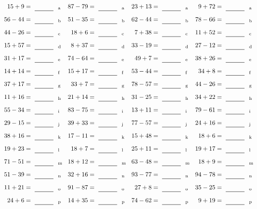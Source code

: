 \documentclass
[
  draft    = true,
  fontsize = 11pt,
  parskip  = half-
]
{scrartcl}
\begin{document}
\clearpage
\begin{align*}
    \pline{15+9}&=\rline{a}
  & \pline{87-79}&=\rline{a}
  & \pline{23+13}&=\rline{a}
  & \pline{9+72}&=\rline{a} \\[1ex]
    \pline{56-44}&=\rline{b}
  & \pline{51-35}&=\rline{b}
  & \pline{62-44}&=\rline{b}
  & \pline{78-66}&=\rline{b} \\[1ex]
    \pline{44-26}&=\rline{c}
  & \pline{18+6}&=\rline{c}
  & \pline{7+38}&=\rline{c}
  & \pline{11+52}&=\rline{c} \\[1ex]
    \pline{15+57}&=\rline{d}
  & \pline{8+37}&=\rline{d}
  & \pline{33-19}&=\rline{d}
  & \pline{27-12}&=\rline{d} \\[1ex]
    \pline{31+17}&=\rline{e}
  & \pline{74-64}&=\rline{e}
  & \pline{49+7}&=\rline{e}
  & \pline{38+26}&=\rline{e} \\[1ex]
    \pline{14+14}&=\rline{f}
  & \pline{15+17}&=\rline{f}
  & \pline{53-44}&=\rline{f}
  & \pline{34+8}&=\rline{f} \\[1ex]
    \pline{37+17}&=\rline{g}
  & \pline{33+7}&=\rline{g}
  & \pline{78-57}&=\rline{g}
  & \pline{44-26}&=\rline{g} \\[1ex]
    \pline{11+16}&=\rline{h}
  & \pline{21+14}&=\rline{h}
  & \pline{31-25}&=\rline{h}
  & \pline{34+22}&=\rline{h} \\[1ex]
    \pline{55-34}&=\rline{i}
  & \pline{83-75}&=\rline{i}
  & \pline{13+11}&=\rline{i}
  & \pline{79-61}&=\rline{i} \\[1ex]
    \pline{29-15}&=\rline{j}
  & \pline{39+33}&=\rline{j}
  & \pline{77-57}&=\rline{j}
  & \pline{24+16}&=\rline{j} \\[1ex]
    \pline{38+16}&=\rline{k}
  & \pline{17-11}&=\rline{k}
  & \pline{15+48}&=\rline{k}
  & \pline{18+6}&=\rline{k} \\[1ex]
    \pline{19+23}&=\rline{l}
  & \pline{18+7}&=\rline{l}
  & \pline{25+11}&=\rline{l}
  & \pline{19+17}&=\rline{l} \\[1ex]
    \pline{71-51}&=\rline{m}
  & \pline{18+12}&=\rline{m}
  & \pline{63-48}&=\rline{m}
  & \pline{18+9}&=\rline{m} \\[1ex]
    \pline{51-39}&=\rline{n}
  & \pline{32+16}&=\rline{n}
  & \pline{93-77}&=\rline{n}
  & \pline{94-78}&=\rline{n} \\[1ex]
    \pline{11+21}&=\rline{o}
  & \pline{91-87}&=\rline{o}
  & \pline{27+8}&=\rline{o}
  & \pline{35-25}&=\rline{o} \\[1ex]
    \pline{24+6}&=\rline{p}
  & \pline{14+35}&=\rline{p}
  & \pline{74-62}&=\rline{p}
  & \pline{9+19}&=\rline{p}
\end{align*}
\end{document}
